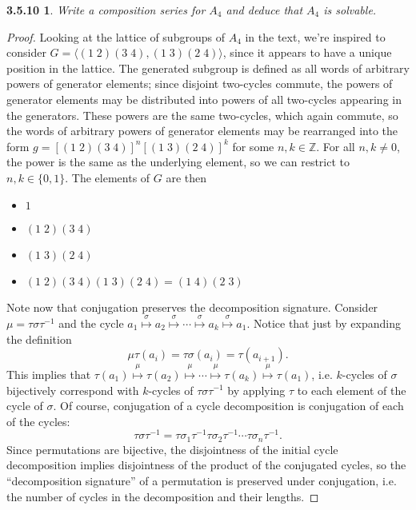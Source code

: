 \documentclass{article}
\newtheorem*{3.5.10}{3.5.10}
\begin{document}
\begin{3.5.10}
  Write a composition series for $A_{4}$ and deduce that $A_{4}$ is solvable.
\end{3.5.10}

\begin{proof}
  Looking at the lattice of subgroups of $A_{4}$ in the text, we're inspired to consider \newline $G = \langle (1 \; 2)(3 \; 4), (1 \; 3)(2 \; 4) \rangle$,
  since it appears to have a unique position in the lattice.
  The generated subgroup is defined as all words of arbitrary powers of generator elements;
  since disjoint two-cycles commute, the powers of generator elements may be distributed into powers of all two-cycles appearing in the generators.
  These powers are the same two-cycles, which again commute, so the words of arbitrary powers of generator elements may be rearranged into the form
  $g = [(1 \; 2)(3 \; 4)]^{n}[(1 \; 3)(2 \; 4)]^{k}$ for some $n,k \in \mathbb{Z}$.
  For all $n,k \neq 0$, the power is the same as the underlying element, so we can restrict to $n, k \in \{0, 1\}$.
  The elements of $G$ are then
  \begin{itemize}
  \item  $1$
  \item $(1 \; 2)(3 \; 4)$
  \item $(1 \; 3)(2 \; 4)$
  \item $(1 \; 2)(3 \; 4)(1 \; 3)(2 \; 4) = (1 \; 4)(2 \; 3)$
  \end{itemize}
  Note now that conjugation preserves the decomposition signature.
  Consider $\mu = \tau\sigma\tau^{-1}$ and the cycle
  $a_{1}\overset{\sigma}{\mapsto}a_{2}\overset{\sigma}{\mapsto}\cdots\overset{\sigma}{\mapsto}a_{k}\overset{\sigma}{\mapsto}a_{1}$.
  Notice that just by expanding the definition
  \[
    \mu\tau(a_{i}) = \tau\sigma(a_{i}) = \tau(a_{i+1}).
  \]
  This implies that
  $\tau(a_{1})\overset{\mu}{\mapsto}\tau(a_{2})\overset{\mu}{\mapsto}  \cdots\overset{\mu}{\mapsto}\tau(a_{k})\overset{\mu}{\mapsto}\tau(a_{1})$,
  i.e. $k$-cycles of $\sigma$ bijectively correspond with $k$-cycles of $\tau\sigma\tau^{-1}$ by applying $\tau$ to each element of the cycle of $\sigma$.
  Of course, conjugation of a cycle decomposition is conjugation of each of the cycles:
  \[
    \tau\sigma\tau^{-1} = \tau\sigma_{1}\tau^{-1}\tau\sigma_{2}\tau^{-1}\cdots\tau\sigma_{n}\tau^{-1}.
  \]
  Since permutations are bijective, the disjointness of the initial cycle decomposition implies disjointness of the product of the conjugated cycles,
  so the ``decomposition signature'' of a permutation is preserved under conjugation, i.e. the number of cycles in the decomposition and their lengths.


\end{proof}
\end{document}
